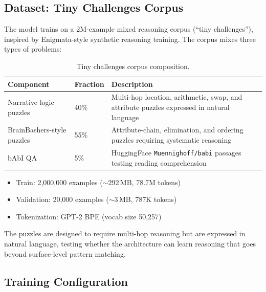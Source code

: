 \documentclass[11pt,a4paper]{article}
\begin{document}
\subsection{Dataset: Tiny Challenges Corpus}

The model trains on a 2M-example mixed reasoning corpus (``tiny challenges''), inspired by Enigmata-style synthetic reasoning training. The corpus mixes three types of problems:

\begin{table}[h]
\centering
\small
\begin{tabularx}{\textwidth}{p{} p{} p{}}
\toprule
\textbf{Component} & \textbf{Fraction} & \textbf{Description} \\
\midrule
Narrative logic puzzles & 40\% & Multi-hop location, arithmetic, swap, and attribute puzzles expressed in natural language \\
BrainBashers-style puzzles & 55\% & Attribute-chain, elimination, and ordering puzzles requiring systematic reasoning \\
bAbI QA & 5\% & HuggingFace \texttt{Muennighoff/babi} passages testing reading comprehension \\
\bottomrule
\end{tabularx}
\caption{Tiny challenges corpus composition.}
\label{tab:corpus}
\end{table}

\begin{itemize}[nosep]
    \item Train: 2,000,000 examples ($\sim$292\,MB, 78.7M tokens)
    \item Validation: 20,000 examples ($\sim$3\,MB, 787K tokens)
    \item Tokenization: GPT-2 BPE (vocab size 50,257)
\end{itemize}

The puzzles are designed to require multi-hop reasoning but are expressed in natural language, testing whether the architecture can learn reasoning that goes beyond surface-level pattern matching.

\subsection{Training Configuration}
\label{sec:training-config}
\end{document}
